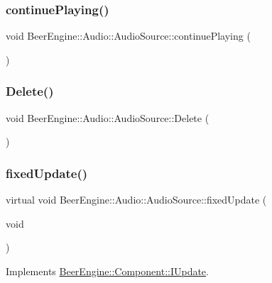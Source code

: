 \subsubsection{\texorpdfstring{continue\+Playing()}{continuePlaying()}}
{\footnotesize\ttfamily void Beer\+Engine\+::\+Audio\+::\+Audio\+Source\+::continue\+Playing (\begin{DoxyParamCaption}{ }\end{DoxyParamCaption})}

\mbox{\label{class_beer_engine_1_1_audio_1_1_audio_source_ae1a09dee4b97025ef4506897c2eb3979}} 
\subsubsection{\texorpdfstring{Delete()}{Delete()}}
{\footnotesize\ttfamily void Beer\+Engine\+::\+Audio\+::\+Audio\+Source\+::\+Delete (\begin{DoxyParamCaption}{ }\end{DoxyParamCaption})}

\mbox{\label{class_beer_engine_1_1_audio_1_1_audio_source_a248900a46e559e0e085b2cb98a766cf2}} 
\subsubsection{\texorpdfstring{fixed\+Update()}{fixedUpdate()}}
{\footnotesize\ttfamily virtual void Beer\+Engine\+::\+Audio\+::\+Audio\+Source\+::fixed\+Update (\begin{DoxyParamCaption}\item[{void}]{ }\end{DoxyParamCaption})\hspace{0.3cm}{\ttfamily [virtual]}}



Implements \mbox{\hyperlink{class_beer_engine_1_1_component_1_1_i_update_a615c127a4729f73713e5eaeee538854b}{Beer\+Engine\+::\+Component\+::\+I\+Update}}.

